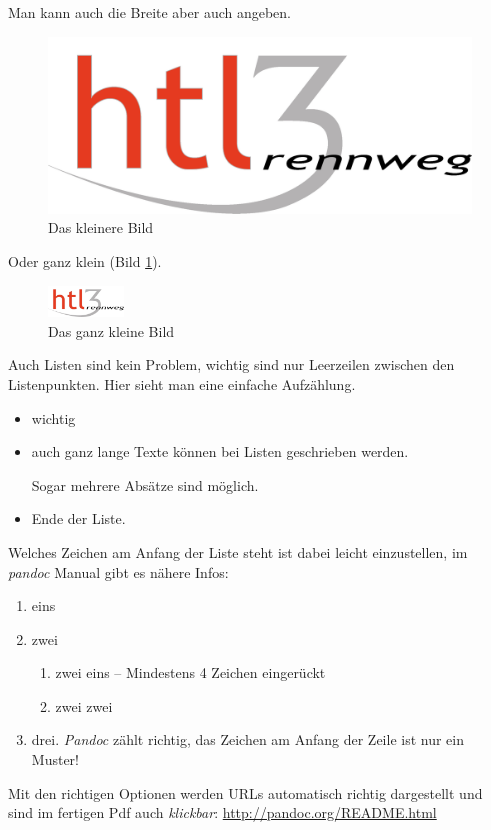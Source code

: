 Man kann auch die Breite aber auch angeben.

\begin{figure}
\centering
\includegraphics[width=12cm,height=\textheight]{HTL3RLogo.png}
\caption{Das kleinere Bild}
\end{figure}

Oder ganz klein (Bild \ref{Bild3}).

\begin{figure}
\centering
\includegraphics[width=2cm,height=\textheight]{HTL3RLogo.png}
\caption{Das ganz kleine Bild\label{Bild3}}
\end{figure}

Auch Listen sind kein Problem, wichtig sind nur Leerzeilen zwischen den
Listenpunkten. Hier sieht man eine einfache Aufzählung.

\begin{itemize}
\item
  wichtig
\item
  auch ganz lange Texte können bei Listen geschrieben werden.

  Sogar mehrere Absätze sind möglich.
\item
  Ende der Liste.
\end{itemize}

Welches Zeichen am Anfang der Liste steht ist dabei leicht einzustellen,
im \emph{pandoc} Manual gibt es nähere Infos:

\begin{enumerate}
\def\labelenumi{\arabic{enumi}.}
\item
  eins
\item
  zwei

  \begin{enumerate}
  \def\labelenumii{\roman{enumii}.}
  \tightlist
  \item
    zwei eins -- Mindestens 4 Zeichen eingerückt
  \item
    zwei zwei
  \end{enumerate}
\item
  drei. \emph{Pandoc} zählt richtig, das Zeichen am Anfang der Zeile ist
  nur ein Muster!
\end{enumerate}

Mit den richtigen Optionen werden URLs automatisch richtig dargestellt
und sind im fertigen Pdf auch \emph{klickbar}:
\url{http://pandoc.org/README.html}
